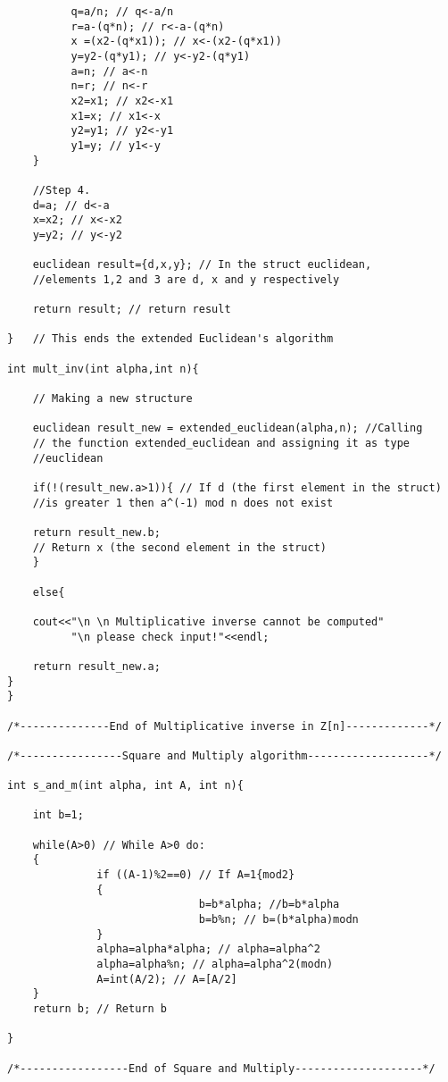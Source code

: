 \documentclass[iwp,first]{luthesis}
\begin{document}
\begin{verbatim}
          q=a/n; // q<-a/n
          r=a-(q*n); // r<-a-(q*n)
          x =(x2-(q*x1)); // x<-(x2-(q*x1))
          y=y2-(q*y1); // y<-y2-(q*y1)
          a=n; // a<-n
          n=r; // n<-r
          x2=x1; // x2<-x1
          x1=x; // x1<-x
          y2=y1; // y2<-y1
          y1=y; // y1<-y
    }
    
    //Step 4.
    d=a; // d<-a
    x=x2; // x<-x2
    y=y2; // y<-y2
    
    euclidean result={d,x,y}; // In the struct euclidean, 
    //elements 1,2 and 3 are d, x and y respectively
    
    return result; // return result
    
}   // This ends the extended Euclidean's algorithm

int mult_inv(int alpha,int n){
        
    // Making a new structure

    euclidean result_new = extended_euclidean(alpha,n); //Calling 
    // the function extended_euclidean and assigning it as type 
    //euclidean
    
    if(!(result_new.a>1)){ // If d (the first element in the struct) 
    //is greater 1 then a^(-1) mod n does not exist 

    return result_new.b; 
    // Return x (the second element in the struct)
    }

    else{

    cout<<"\n \n Multiplicative inverse cannot be computed"
          "\n please check input!"<<endl;
    
    return result_new.a; 
}   
}

/*--------------End of Multiplicative inverse in Z[n]-------------*/

/*----------------Square and Multiply algorithm-------------------*/

int s_and_m(int alpha, int A, int n){
    
    int b=1;
    
    while(A>0) // While A>0 do:
    {
              if ((A-1)%2==0) // If A=1{mod2}
              {
                              b=b*alpha; //b=b*alpha
                              b=b%n; // b=(b*alpha)modn
              }
              alpha=alpha*alpha; // alpha=alpha^2
              alpha=alpha%n; // alpha=alpha^2(modn)
              A=int(A/2); // A=[A/2]
    }
    return b; // Return b
    
}

/*-----------------End of Square and Multiply--------------------*/ 


\end{verbatim}
\end{document}
